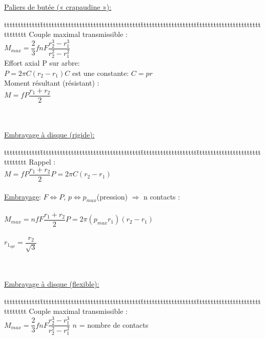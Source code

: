 \underline{Paliers de butée (« crapaudine »):}\\

\begin{bluebox}
\begin{tabbing}
ttttttttttttt\=tttttttttttttttttttttttttttttttttttt\=tttttttttttttttttttt\=ttttttttttttttttttttttttttttttt\kill
Couple maximal transmissible :\\
\>$M_{max}=\dfrac{2}{3}fnF\dfrac{r^3_2-r^3_1}{r^2_2-r^2_1}$\\
Effort axial P sur arbre:\\
\>$P = 2\pi C(r_2-r_1)$\>$C$ est une constante: $C=pr$\\
Moment résultant (résistant) :\\
\>$M=fP\dfrac{r_1+r_2}{2}$
\end{tabbing}
\end{bluebox}\\\\

\underline{Embrayage à disque (rigide):}

\begin{bluebox}
\begin{tabbing}
ttttttttttttt\=tttttttttttttttttttttttttttttttttttt\=tttttttttttttttttttt\=ttttttttttttttttttttttttttttttt\kill
Rappel :\\
\>$M=fP\dfrac{r_1+r_2}{2}$\>$P = 2\pi C(r_2-r_1)$\\\\
\underline{Embrayage}: $F\Leftrightarrow P$, $p\Leftrightarrow p_{max}$(pression) $\Rightarrow$ n contacts :\\\\
\>$M_{max}=nfF\dfrac{r_1+r_2}{2}$\>$P = 2\pi (p_{max}r_1)(r_2-r_1)$\\\\
\>\>$r_{1_{opt}}=\dfrac{r_2}{\sqrt{3}}$
\end{tabbing}
\end{bluebox}\\\\

\underline{Embrayage à disque (flexible):}

\begin{bluebox}
\begin{tabbing}
ttttttttttttt\=tttttttttttttttttttttttttttttttttttt\=tttttttttttttttttttt\=ttttttttttttttttttttttttttttttt\kill
Couple maximal transmissible :\\
\>$M_{max}=\dfrac{2}{3}fnF\dfrac{r^3_2-r^3_1}{r^2_2-r^2_1}$\> $n$ = nombre de contacts
\end{tabbing}
\end{bluebox}\\\\

